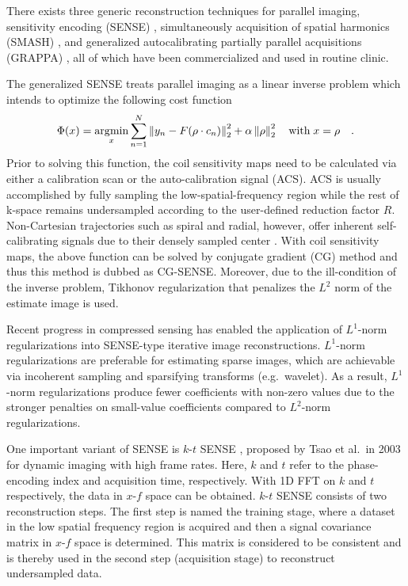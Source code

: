 There exists three generic reconstruction techniques for parallel imaging, sensitivity encoding (\acs{SENSE}) \cite{1999_SENSE,2001_gSENSE}, simultaneously acquisition of spatial harmonics (\acs{SMASH}) \cite{1997_SMASH}, and generalized autocalibrating partially parallel acquisitions (\acs{GRAPPA}) \cite{2002_GRAPPA}, all of which have been commercialized and used in routine clinic. 

The generalized SENSE treats parallel imaging as a linear inverse problem which intends to optimize the following cost function
\begin{equation} \label{Equ:mri_inv_cost}
  \Phi(x) = \operatorname*{\arg\!\min}\limits_x \sum_{n=1}^{N} \left\lVert y_n - F(\rho \cdot c_n)\right\rVert_2^2 + \alpha \left\lVert\rho\right\rVert_2^2 \quad \text{with} \; x = \rho \quad .
\end{equation}
Prior to solving this function, the coil sensitivity maps need to be calculated via either a calibration scan or the auto-calibration signal (\acs{ACS}). ACS is usually accomplished by fully sampling the low-spatial-frequency region while the rest of k-space remains undersampled according to the user-defined reduction factor $R$. Non-Cartesian trajectories such as spiral and radial, however, offer inherent self-calibrating signals due to their densely sampled center \cite{2005_self_cal_pi}. With coil sensitivity maps, the above function can be solved by conjugate gradient (\acs{CG}) method and thus this method is dubbed as CG-SENSE. Moreover, due to the ill-condition of the inverse problem, Tikhonov regularization that penalizes the $L^2$ norm of the estimate image is used. 

Recent progress in compressed sensing \cite{2006_CS} has enabled the application of $L^1$-norm regularizations into SENSE-type iterative image reconstructions. $L^1$-norm regularizations are preferable for estimating sparse images, which are achievable via incoherent sampling and sparsifying transforms (e.g.~wavelet). As a result, $L^1$-norm regularizations produce fewer coefficients with non-zero values due to the stronger penalties on small-value coefficients compared to $L^2$-norm regularizations. 

One important variant of SENSE is $k$-$t$ SENSE \cite{2003_k-t_SENSE}, proposed by Tsao et al.~in 2003 for dynamic imaging with high frame rates. Here, $k$ and $t$ refer to the phase-encoding index and acquisition time, respectively. With 1D FFT on $k$ and $t$ respectively, the data in $x$-$f$ space can be obtained. $k$-$t$ SENSE consists of two reconstruction steps. The first step is named the training stage, where a dataset in the low spatial frequency region is acquired and then a signal covariance matrix in $x$-$f$ space is determined. This matrix is considered to be consistent and is thereby used in the second step (acquisition stage) to reconstruct undersampled data.

